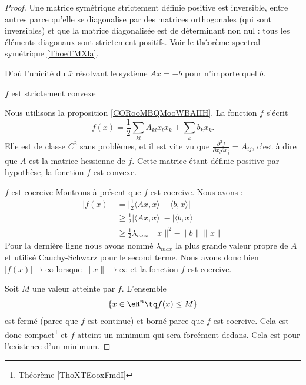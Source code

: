 \begin{proof}

    Une matrice symétrique strictement définie positive est inversible, entre autres parce qu'elle se diagonalise par des matrices orthogonales (qui sont inversibles) et que la matrice diagonalisée est de déterminant non nul : tous les éléments diagonaux sont strictement positifs. Voir le théorème spectral symétrique \ref{ThoeTMXla}.

    D'où l'unicité du \( \bar x\) résolvant le système \( Ax=-b\) pour n'importe quel \( b\).

    \begin{subproof}
    \item[\( f\) est strictement convexe]
        
        Nous utilisons la proposition \ref{CORooMBQMooWBAIIH}. La fonction \( f\) s'écrit
    \begin{equation}
        f(x)=\frac{ 1 }{2}\sum_{kl}A_{kl}x_lx_k+\sum_kb_kx_k.
    \end{equation}
    Elle est de classe \( C^2\) sans problèmes, et il est vite vu que \( \frac{ \partial^2f }{ \partial x_i\partial x_j }=A_{ij}\), c'est à dire que \( A\) est la matrice hessienne de \( f\). Cette matrice étant définie positive par hypothèse, la fonction \( f\) est convexe.

\item[\( f\) est coercive]
    Montrons à présent que \( f\) est coercive. Nous avons :
    \begin{subequations}
        \begin{align}
            | f(x) |&=\big| \frac{ 1 }{2}\langle Ax, x\rangle +\langle b, x\rangle  \big|\\
            &\geq\frac{ 1 }{2}| \langle Ax, x\rangle  |-| \langle b, x\rangle  |\\
            &\geq\frac{ 1 }{2}\lambda_{max}\| x \|^2-\| b \|\| x \|
        \end{align}
    \end{subequations}
    Pour la dernière ligne nous avons nommé \( \lambda_{max}\) la plus grande valeur propre de \( A\) et utilisé Cauchy-Schwarz pour le second terme. Nous avons donc bien \( | f(x) |\to \infty\) lorsque \( \| x \|\to\infty\) et la fonction \( f\) est coercive.
    \end{subproof}

    Soit \( M\) une valeur atteinte par \( f\). L'ensemble
    \begin{equation}
        \{ x\in \eR^n\tq f(x)\leq M \}
    \end{equation}
    est fermé (parce que \( f\) est continue) et borné parce que \( f\) est coercive. Cela est donc compact\footnote{Théorème \ref{ThoXTEooxFmdI}} et \( f\) atteint un minimum qui sera forcément dedans. Cela est pour l'existence d'un minimum.


\end{proof}
